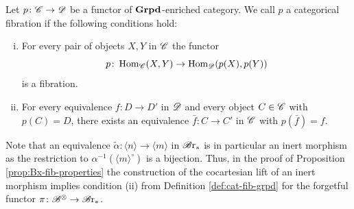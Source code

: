 
\begin{defin}\label{def:cat-fib-grpd} Let $p \colon \mathscr{C} \to \mathscr{D}$ be a functor of
    $\operatorname{\textbf{Grpd}}$-enriched category. We call $p$ a categorical fibration if the
    following conditions hold:
    \begin{enumerate}[(i)]

        \item For every pair of objects $X,Y$ in $\mathscr{C}$ the functor
        \[
            p \colon \operatorname{Hom}_{\mathscr{C}}(X,Y) \to \operatorname{Hom}_{\mathscr{D}}(p(X), p(Y))
        \]
        is a fibration.
        \item For every equivalence $f \colon D \to D'$ in $\mathscr{D}$ and every object
        $C \in \mathscr{C}$ with $p(C) = D$, there exists an equivalence $\bar{f} \colon
        C \to C'$ in $\mathscr{C}$ with $p(\bar{f}) = f$.
    \end{enumerate}
\end{defin}

\begin{rem}
    Note that an equivalence $\widetilde{\alpha} \colon \langle n \rangle \to
    \langle m \rangle$ in $\mathscr{B} \text{r}_{\ast}$ is in particular an inert morphism as the
    restriction to $\alpha^{-1}(\langle m \rangle^{\circ})$ is a bijection.
    Thus, in the proof of Proposition \ref{prop:Bx-fib-properties} the
    construction of the cocartesian lift of an inert morphism implies condition
    (ii) from Definition \ref{def:cat-fib-grpd} for the forgetful functor $\pi
    \colon \mathscr{B}^{\otimes} \to \mathscr{B} \text{r}_{\ast}$.
\end{rem}

